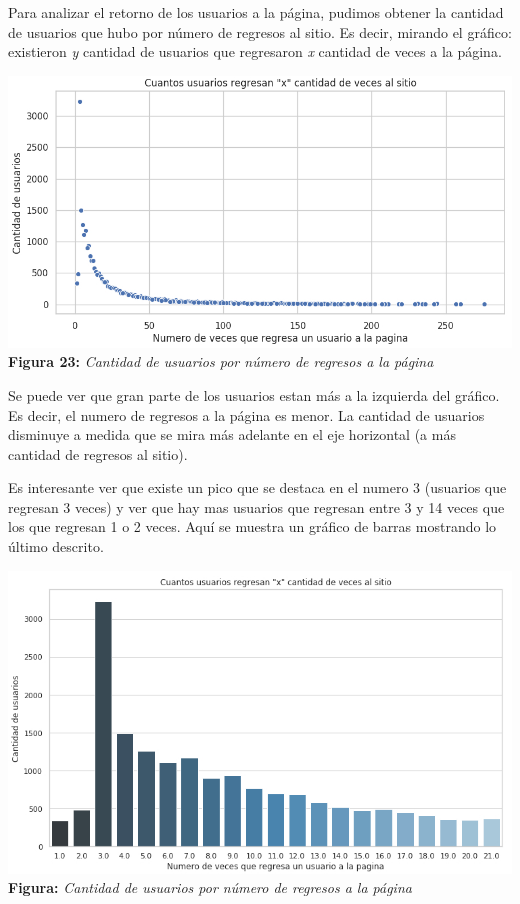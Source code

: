 \documentclass[titlepage,a4paper]{article}
\begin{document}
	Para analizar el retorno de los usuarios a la página, pudimos obtener la cantidad de usuarios que hubo por número de regresos al sitio. Es decir, mirando el gráfico: existieron \textit{y} cantidad de usuarios que regresaron \textit{x} cantidad de veces a la página.
	
	\begin{center}
   \includegraphics[width=14cm]{regresosPorUsuario.jpg}\\
	\textbf{Figura 23:}  \textit{Cantidad de usuarios por número de regresos a la página}
	\end{center}
	
   Se puede ver que gran parte de los usuarios estan más a la izquierda del gráfico. Es decir, el numero de regresos a la página es menor. La cantidad de usuarios disminuye a medida que se mira más adelante en el eje horizontal (a más cantidad de regresos al sitio).   
   
 Es interesante ver que existe un pico que se destaca en el numero 3 (usuarios que regresan 3 veces) y ver que hay mas usuarios que regresan entre 3 y 14 veces que los que regresan 1 o 2 veces. Aquí se muestra un gráfico de barras mostrando lo último descrito.	
 
	 \begin{center}
   \includegraphics[width=14cm]{barrasRegresos.jpg}\\
	\textbf{Figura:}  \textit{Cantidad de usuarios por número de regresos a la página}
	\end{center}
	
\end{document}
